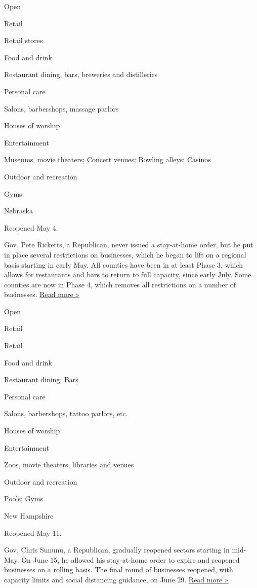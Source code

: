 Open

Retail

Retail stores

Food and drink

Restaurant dining, bars, breweries and distilleries

Personal care

Salons, barbershops, massage parlors

Houses of worship

Entertainment

Museums, movie theaters; Concert venues; Bowling alleys; Casinos

Outdoor and recreation

Gyms

Nebraska

Reopened May 4.

Gov. Pete Ricketts, a Republican, never issued a stay-at-home order, but
he put in place several restrictions on businesses, which he began to
lift on a regional basis starting in early May. All counties have been
in at least Phase 3, which allows for restaurants and bars to return to
full capacity, since early July. Some counties are now in Phase 4, which
removes all restrictions on a number of businesses.
\href{https://journalstar.com/lifestyles/health-med-fit/health/covid-19-restrictions-eased-in-more-nebraska-counties/article_a548e328-3c36-5dd2-8704-720256692fb3.html}{Read
more »}

Open

Retail

Retail

Food and drink

Restaurant dining; Bars

Personal care

Salons, barbershops, tattoo parlors, etc.

Houses of worship

Entertainment

Zoos, movie theaters, libraries and venues

Outdoor and recreation

Pools; Gyms

New Hampshire

Reopened May 11.

Gov. Chris Sununu, a Republican, gradually reopened sectors starting in
mid-May. On June 15, he allowed his stay-at-home order to expire and
reopened businesses on a rolling basis. The final round of businesses
reopened, with capacity limits and social distancing guidance, on June
29.
\href{https://www.unionleader.com/news/health/coronavirus/all-nh-businesses-now-have-date-to-reopen/article_558bfac2-5c67-5163-9fa3-7d7fcb426d9f.html}{Read
more »}

